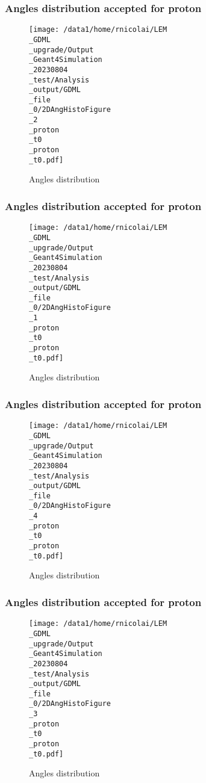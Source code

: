 \documentclass[8pt]{beamer}
\begin{document}
            \begin{frame}
                \frametitle{Angles distribution accepted for proton}
            
        \begin{figure}[h]
            \centering
            \texttt{[image: /data1/home/rnicolai/LEM\\\_GDML\\\_upgrade/Output\\\_Geant4Simulation\\\_20230804\\\_test/Analysis\\\_output/GDML\\\_file\\\_0/2DAngHistoFigure\\\_2\\\_proton\\\_t0\\\_proton\\\_t0.pdf]}
            \caption{Angles distribution}
        \end{figure}
        
            \end{frame}
            
            \begin{frame}
                \frametitle{Angles distribution accepted for proton}
            
        \begin{figure}[h]
            \centering
            \texttt{[image: /data1/home/rnicolai/LEM\\\_GDML\\\_upgrade/Output\\\_Geant4Simulation\\\_20230804\\\_test/Analysis\\\_output/GDML\\\_file\\\_0/2DAngHistoFigure\\\_1\\\_proton\\\_t0\\\_proton\\\_t0.pdf]}
            \caption{Angles distribution}
        \end{figure}
        
            \end{frame}
            
            \begin{frame}
                \frametitle{Angles distribution accepted for proton}
            
        \begin{figure}[h]
            \centering
            \texttt{[image: /data1/home/rnicolai/LEM\\\_GDML\\\_upgrade/Output\\\_Geant4Simulation\\\_20230804\\\_test/Analysis\\\_output/GDML\\\_file\\\_0/2DAngHistoFigure\\\_4\\\_proton\\\_t0\\\_proton\\\_t0.pdf]}
            \caption{Angles distribution}
        \end{figure}
        
            \end{frame}
            
            \begin{frame}
                \frametitle{Angles distribution accepted for proton}
            
        \begin{figure}[h]
            \centering
            \texttt{[image: /data1/home/rnicolai/LEM\\\_GDML\\\_upgrade/Output\\\_Geant4Simulation\\\_20230804\\\_test/Analysis\\\_output/GDML\\\_file\\\_0/2DAngHistoFigure\\\_3\\\_proton\\\_t0\\\_proton\\\_t0.pdf]}
            \caption{Angles distribution}
        \end{figure}
        
            \end{frame}
            
\end{document}
